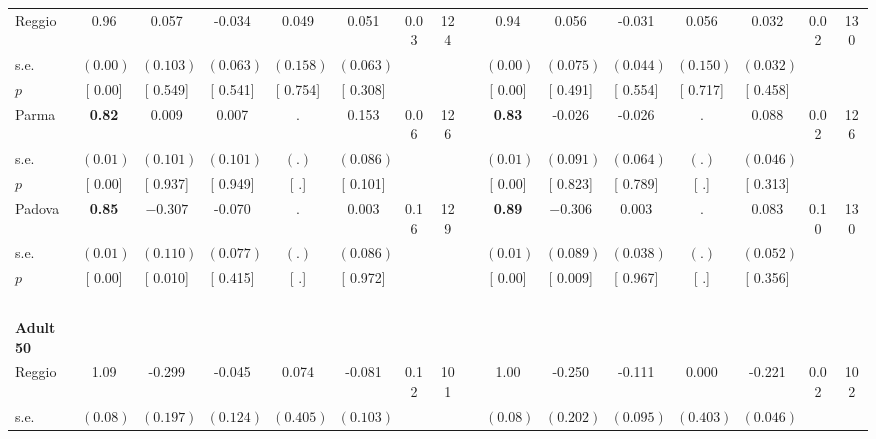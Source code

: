 \begin{longtable}{L{8em} c c c c c c c p{1em} c c c c c c c}
\quad \quad \quad Reggio& 0.96 &     0.057 &    -0.034 &     0.049 &     0.051 &      0.03 &       124 & & 0.94 &     0.056 &    -0.031 &     0.056 &     0.032 &      0.02 &       130  \\*
\quad \quad \quad \quad s.e.& $ (     0.00)$ & $ (    0.103)$ & $ (    0.063)$ & $ (    0.158)$ & $ (    0.063)$ & & & & $ (     0.00)$ & $ (    0.075)$ & $ (    0.044)$ & $ (    0.150)$ & $ (    0.032)$ & &  \\*
\quad \quad \quad \quad $ p$ & [     0.00] & [    0.549] & [    0.541] & [    0.754] & [    0.308] & & & & [     0.00] & [    0.491] & [    0.554] & [    0.717] & [    0.458] & &  \\[1em]
\quad \quad \quad Parma& \textbf{     0.82} &     0.009 &     0.007 &         . &     0.153 &      0.06 &       126 & & \textbf{     0.83} &    -0.026 &    -0.026 &         . &     0.088 &      0.02 &       126  \\*
\quad \quad \quad \quad s.e.& $ (     0.01)$ & $ (    0.101)$ & $ (    0.101)$ & $ (        .)$ & $ (    0.086)$ & & & & $ (     0.01)$ & $ (    0.091)$ & $ (    0.064)$ & $ (        .)$ & $ (    0.046)$ & &  \\*
\quad \quad \quad \quad $ p$ & [     0.00] & [    0.937] & [    0.949] & [        .] & [    0.101] & & & & [     0.00] & [    0.823] & [    0.789] & [        .] & [    0.313] & &  \\[1em]
\quad \quad \quad Padova& \textbf{     0.85} & $ \mathbf{   -0.307}$ &    -0.070 &         . &     0.003 &      0.16 &       129 & & \textbf{     0.89} & $ \mathbf{   -0.306}$ &     0.003 &         . &     0.083 &      0.10 &       130  \\*
\quad \quad \quad \quad s.e.& $ (     0.01)$ & $ (    0.110)$ & $ (    0.077)$ & $ (        .)$ & $ (    0.086)$ & & & & $ (     0.01)$ & $ (    0.089)$ & $ (    0.038)$ & $ (        .)$ & $ (    0.052)$ & &  \\*
\quad \quad \quad \quad $ p$ & [     0.00] & [    0.010] & [    0.415] & [        .] & [    0.972] & & & & [     0.00] & [    0.009] & [    0.967] & [        .] & [    0.356] & &  \\[1em]
~\\[1em]
\quad \quad \textbf{Adult 50} & & & & & & & & & & & & & & & \\* 
\quad \quad \quad Reggio& 1.09 &    -0.299 &    -0.045 &     0.074 &    -0.081 &      0.12 &       101 & & 1.00 &    -0.250 &    -0.111 &     0.000 &    -0.221 &      0.02 &       102  \\*
\quad \quad \quad \quad s.e.& $ (     0.08)$ & $ (    0.197)$ & $ (    0.124)$ & $ (    0.405)$ & $ (    0.103)$ & & & & $ (     0.08)$ & $ (    0.202)$ & $ (    0.095)$ & $ (    0.403)$ & $ (    0.046)$ & &  \\*

\end{longtable}
